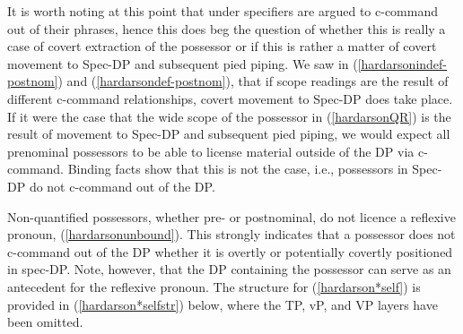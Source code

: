 \documentclass[output=paper,colorlinks,citecolor=brown,
]{langscibook}
\begin{document}
\begin{exe}
	 \vspace{-5pt}
\end{exe}

\noindent It is worth noting at this point that under \cite[22ff]{Kayne:1994uo} specifiers are argued to c-command out of their phrases, hence this does beg the question of whether this is really a case of covert extraction of the possessor or if this is rather a matter of covert movement to Spec-DP and subsequent pied piping. We saw in (\ref{hardarsonindef-postnom}) and (\ref{hardarsondef-postnom}), that if scope readings are the result of different c-command relationships, covert movement to Spec-DP does take place. If it were the case that the wide scope of the possessor in (\ref{hardarsonQR}) is the result of movement to Spec-DP and subsequent pied piping, we would expect all prenominal possessors to be able to license material outside of the DP via c-command. Binding facts show that this is not the case, i.e., possessors in Spec-DP do not c-command out of the DP.

Non-quantified possessors, whether pre- or postnominal, do not licence a reflexive pronoun, (\ref{hardarsonunbound}). This strongly indicates that a possessor does not c-command out of the DP whether it is overtly or potentially covertly positioned in spec-DP. Note, however, that the DP containing the possessor can serve as an antecedent for the reflexive pronoun. The structure for (\ref{hardarson*self}) is provided in (\ref{hardarson*selfstr}) below, where the TP, vP, and VP layers have been omitted.
\end{document}
